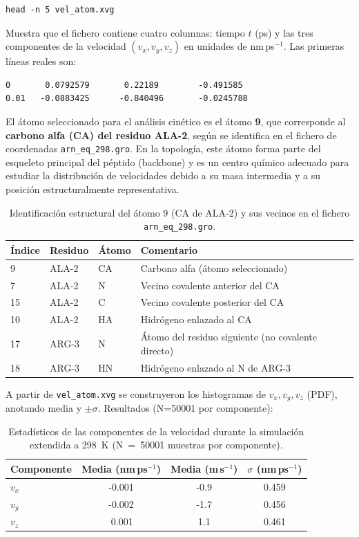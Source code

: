\documentclass[12pt,a4paper]{article}
\begin{document}
\begin{verbatim}
head -n 5 vel_atom.xvg
\end{verbatim}

Muestra que el fichero contiene cuatro columnas: tiempo $t$ (ps) y las tres
componentes de la velocidad $(v_x, v_y, v_z)$ en unidades de nm\,ps$^{-1}$. Las
primeras líneas reales son:

\begin{verbatim}
0       0.0792579       0.22189        -0.491585
0.01   -0.0883425      -0.840496       -0.0245788
\end{verbatim}

El átomo seleccionado para el análisis cinético es el átomo \textbf{9}, que corresponde al \textbf{carbono alfa (CA) del residuo ALA-2}, según se identifica en el fichero de coordenadas \texttt{arn\_eq\_298.gro}. En la topología, este átomo forma parte del esqueleto principal del péptido (backbone) y es un centro químico adecuado para estudiar la distribución de velocidades debido a su masa intermedia y a su posición estructuralmente representativa.

\begin{table}[H]
\centering
\begin{tabular}{llll}
\toprule
\textbf{Índice} & \textbf{Residuo} & \textbf{Átomo} & \textbf{Comentario} \\
\midrule
9   & ALA-2 & CA   & Carbono alfa (átomo seleccionado) \\
7   & ALA-2 & N    & Vecino covalente anterior del CA \\
15  & ALA-2 & C    & Vecino covalente posterior del CA \\
10  & ALA-2 & HA   & Hidrógeno enlazado al CA \\
17  & ARG-3 & N    & Átomo del residuo siguiente (no covalente directo) \\
18  & ARG-3 & HN   & Hidrógeno enlazado al N de ARG-3 \\
\bottomrule
\end{tabular}
\caption{Identificación estructural del átomo 9 (CA de ALA-2) y sus vecinos en el fichero \texttt{arn\_eq\_298.gro}.}
\label{tab:atom9}
\end{table}

\noindent
A partir de \texttt{vel\_atom.xvg} se construyeron los histogramas de \(v_x, v_y, v_z\) (PDF), anotando media y \(\pm\sigma\). Resultados (N=\num{50001} por componente):

\begin{table}[H]
\centering
\begin{tabular}{lccc}
\toprule
\textbf{Componente} & \textbf{Media (nm\,ps$^{-1}$)} & \textbf{Media (m\,s$^{-1}$)} & \textbf{$\sigma$ (nm\,ps$^{-1}$)} \\
\midrule
$v_x$ & -0.001 & -0.9  & 0.459 \\
$v_y$ & -0.002 & -1.7  & 0.456 \\
$v_z$ &  \,0.001 &  1.1 & 0.461 \\
\bottomrule
\end{tabular}
\caption{Estadísticos de las componentes de la velocidad durante la simulación extendida a 298~K (N~=~50001 muestras por componente).}
\label{tab:velstats298}
\end{table}
\end{document}
